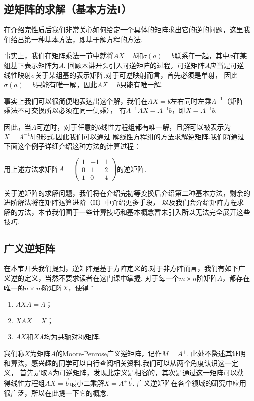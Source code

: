 \subsection{逆矩阵的求解（基本方法I）}
在介绍完性质后我们非常关心如何给定一个具体的矩阵求出它的逆的问题，这里我们给出第一种基本方法，即基于解方程的方法.

事实上，我们在矩阵乘法一节中就将$AX=b$和$\sigma(a)=b$联系在一起，其中$\sigma$在某组基下表示矩阵为$A$.
回顾本讲开头引入可逆矩阵的过程，可逆矩阵$A$应当是可逆线性映射$\sigma$关于某组基的表示矩阵.对于可逆映射而言，首先必须是单射，
因此$\sigma(a)=b$只能有唯一解，因此$AX=b$只能有唯一解.

事实上我们可以很简便地表达出这个解，我们在$AX=b$左右同时左乘$A^{-1}$（矩阵乘法不可交换所以必须在同一侧乘），
有$A^{-1}AX=A^{-1}b$，即$X=A^{-1}b$.

因此，当$A$可逆时，对于任意的$b$线性方程组都有唯一解，且解可以被表示为$X=A^{-1}b$的形式.因此我们可以通过
解线性方程组的方法求解逆矩阵.我们将通过下面这个例子详细介绍这种方法的计算过程：
\begin{example}
    用上述方法求矩阵$A=\begin{pmatrix}1 & -1 & 1 \\ 0 & 1 & 2 \\ 1 & 0 & 4\end{pmatrix}$的逆矩阵.
\end{example}
\begin{solution}

\end{solution}

关于逆矩阵的求解问题，我们将在介绍完初等变换后介绍第二种基本方法，剩余的进阶解法将在矩阵运算进阶（II）中介绍更多手段，
以及我们会介绍矩阵方程求解的方法，本节我们囿于一些计算技巧和基本概念暂未引入所以无法完全展开这些技巧.

\subsection{广义逆矩阵}
在本节开头我们提到，逆矩阵是基于方阵定义的.对于非方阵而言，我们有如下广义逆的定义，当然不要求读者在这门课中掌握.
对于每一个$m \times n$阶矩阵$A$，都存在唯一的$n \times m$阶矩阵$X$，使得：
\begin{enumerate}
    \item $AXA=A$；
    \item $XAX=X$；
    \item $AX$和$XA$均为共轭对称矩阵.
\end{enumerate}
我们称$X$为矩阵$A$的Moore-Penrose广义逆矩阵，记作$M=A^+$.
此处不赘述其证明和算法，感兴趣的同学可以自行查阅相关资料.我们可以从两个角度认识这一定义，
首先是取$A$为可逆矩阵，发现此定义是相容的，其次是通过这一矩阵可以获得线性方程组$AX=\vec{b}$最小二乘解$X=A^+\vec{b}$.
广义逆矩阵在各个领域的研究中应用很广泛，所以在此提一下它的概念.

